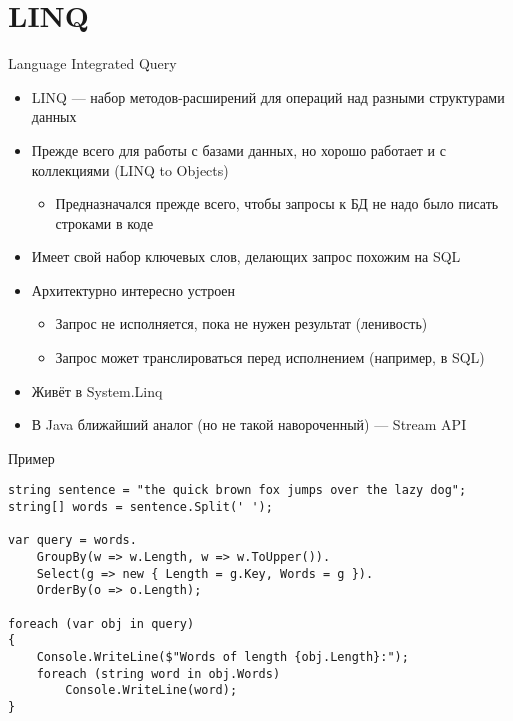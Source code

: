 \documentclass{../../slides-style}
\begin{document}
    \section{LINQ}

    \begin{frame}{Language Integrated Query}
        \begin{itemize}
            \item LINQ --- набор методов-расширений для операций над разными структурами данных
            \item Прежде всего для работы с базами данных, но хорошо работает и с коллекциями (LINQ to Objects)
            \begin{itemize}
                \item Предназначался прежде всего, чтобы запросы к БД не надо было писать строками в коде
            \end{itemize}
            \item Имеет свой набор ключевых слов, делающих запрос похожим на SQL
            \item Архитектурно интересно устроен
            \begin{itemize}
                \item Запрос не исполняется, пока не нужен результат (ленивость)
                \item Запрос может транслироваться перед исполнением (например, в SQL)
            \end{itemize}
            \item Живёт в System.Linq
            \item В Java ближайший аналог (но не такой навороченный) --- Stream API
        \end{itemize}
    \end{frame}

    \begin{frame}[fragile]{Пример}
        \begin{verbatim}
string sentence = "the quick brown fox jumps over the lazy dog";
string[] words = sentence.Split(' ');

var query = words.
    GroupBy(w => w.Length, w => w.ToUpper()).
    Select(g => new { Length = g.Key, Words = g }).
    OrderBy(o => o.Length);

foreach (var obj in query)
{
    Console.WriteLine($"Words of length {obj.Length}:");
    foreach (string word in obj.Words)
        Console.WriteLine(word);
}
        \end{verbatim}
    \end{frame}
\end{document}
